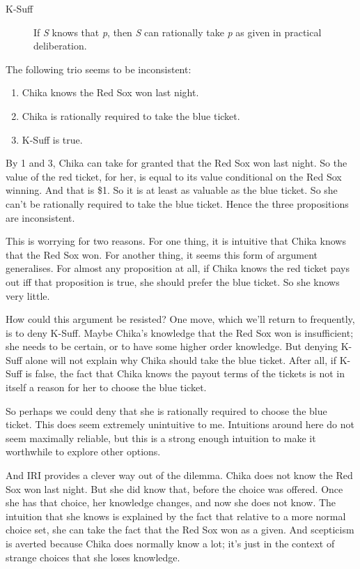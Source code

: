 \documentclass[11pt,oneside]{book}
\begin{document}
\begin{description}

\item[K-Suff]

If \emph{S} knows that \emph{p}, then \emph{S} can rationally take \emph{p} as given in practical deliberation.
\end{description}
The following trio seems to be inconsistent:

\begin{enumerate}
\item Chika knows the Red Sox won last night.

\item Chika is rationally required to take the blue ticket.

\item K-Suff is true.

\end{enumerate}
By 1 and 3, Chika can take for granted that the Red Sox won last night. So the value of the red ticket, for her, is equal to its value conditional on the Red Sox winning. And that is \$1. So it is at least as valuable as the blue ticket. So she can't be rationally required to take the blue ticket. Hence the three propositions are inconsistent.

This is worrying for two reasons. For one thing, it is intuitive that Chika knows that the Red Sox won. For another thing, it seems this form of argument generalises. For almost any proposition at all, if Chika knows the red ticket pays out iff that proposition is true, she should prefer the blue ticket. So she knows very little.

How could this argument be resisted? One move, which we'll return to frequently, is to deny K-Suff. Maybe Chika's knowledge that the Red Sox won is insufficient; she needs to be certain, or to have some higher order knowledge. But denying K-Suff alone will not explain why Chika should take the blue ticket. After all, if K-Suff is false, the fact that Chika knows the payout terms of the tickets is not in itself a reason for her to choose the blue ticket. 

So perhaps we could deny that she is rationally required to choose the blue ticket. This does seem extremely unintuitive to me. Intuitions around here do not seem maximally reliable, but this is a strong enough intuition to make it worthwhile to explore other options.

And IRI provides a clever way out of the dilemma. Chika does not know the Red Sox won last night. But she did know that, before the choice was offered. Once she has that choice, her knowledge changes, and now she does not know. The intuition that she knows is explained by the fact that relative to a more normal choice set, she can take the fact that the Red Sox won as a given. And scepticism is averted because Chika does normally know a lot; it's just in the context of strange choices that she loses knowledge.
\end{document}
